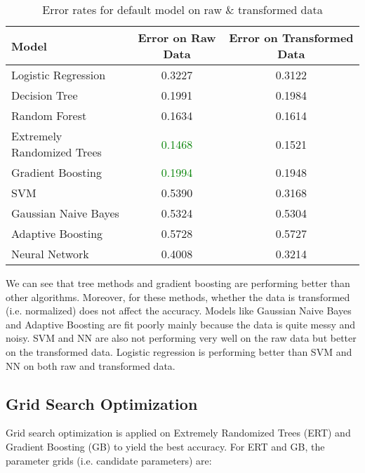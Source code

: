 \documentclass[11pt]{article}
\begin{document}
\begin{table}[h]
    \label{default_model}
    \centering
    \begin{tabular}{l c c}
        \hline
        \textbf{Model} & \textbf{Error on Raw Data} & \textbf{Error on Transformed Data} \\ \hline
        Logistic Regression & 0.3227 & 0.3122 \\
        Decision Tree & 0.1991 & 0.1984 \\
        Random Forest & 0.1634 & 0.1614 \\
        Extremely Randomized Trees & \textcolor{green}{0.1468} & 0.1521 \\
        Gradient Boosting & \textcolor{green}{0.1994} & 0.1948 \\
        SVM & 0.5390 & 0.3168 \\
        Gaussian Naive Bayes & 0.5324 & 0.5304 \\
        Adaptive Boosting & 0.5728 & 0.5727 \\
        Neural Network & 0.4008 & 0.3214 \\
        \hline
    \end{tabular}
    \caption{Error rates for default model on raw $\&$ transformed data}
\end{table}

\noindent We can see that tree methods and gradient boosting are performing better than other algorithms. Moreover, for these methods, whether the data is transformed (i.e. normalized) does not affect the accuracy. Models like Gaussian Naive Bayes and Adaptive Boosting are fit poorly mainly because the data is quite messy and noisy. SVM and NN are also not performing very well on the raw data but better on the transformed data. Logistic regression is performing better than SVM and NN on both raw and transformed data.

\subsection{Grid Search Optimization}
Grid search optimization is applied on Extremely Randomized Trees (ERT) and Gradient Boosting (GB) to yield the best accuracy. For ERT and GB, the parameter grids (i.e. candidate parameters) are:\\
\end{document}
